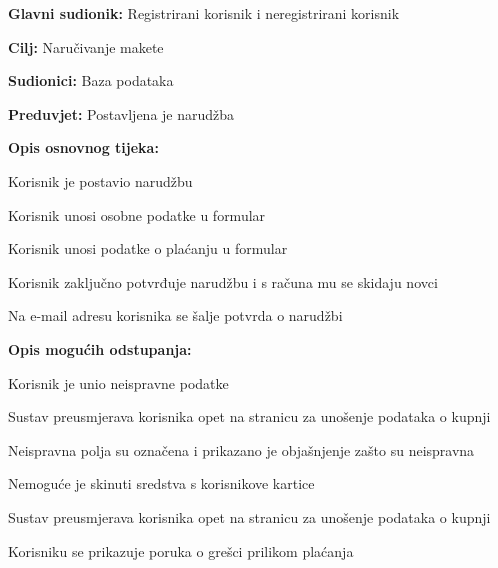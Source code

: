 					\noindent {}
					\begin{packed_item}
						
						\item \textbf{Glavni sudionik: }Registrirani korisnik i neregistrirani korisnik
						\item  \textbf{Cilj:} Naručivanje makete
						\item  \textbf{Sudionici:} Baza podataka
						\item  \textbf{Preduvjet:} Postavljena je narudžba
						\item  \textbf{Opis osnovnog tijeka:}
						
						\item[] \begin{packed_enum}
							\item Korisnik je postavio narudžbu
							\item Korisnik unosi osobne podatke u formular
							\item Korisnik unosi podatke o plaćanju u formular 
							\item Korisnik zaključno potvrđuje narudžbu i s računa mu se skidaju novci
							\item Na e-mail adresu korisnika se šalje potvrda o narudžbi
						\end{packed_enum}
					
						\item  \textbf{Opis mogućih odstupanja:}
					
					\item[] \begin{packed_item}
						
						\item[4.a] Korisnik je unio neispravne podatke
						\item[] \begin{packed_enum}
							
							\item Sustav preusmjerava korisnika opet na stranicu za unošenje podataka o kupnji
							\item Neispravna polja su označena i prikazano je objašnjenje zašto su neispravna
							
						\end{packed_enum}
					
						\item[4.b] Nemoguće je skinuti sredstva s korisnikove kartice
						\item[] \begin{packed_enum}
							
							\item Sustav preusmjerava korisnika opet na stranicu za unošenje podataka o kupnji
							\item Korisniku se prikazuje poruka o grešci prilikom plaćanja
							
						\end{packed_enum}
						
					\end{packed_item}
						
					\end{packed_item}
				
